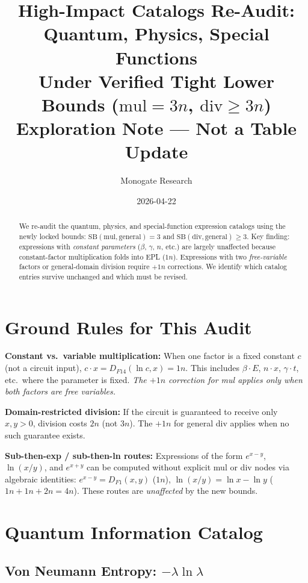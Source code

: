 \documentclass[11pt]{article}
\title{High-Impact Catalogs Re-Audit: Quantum, Physics, Special Functions\\
\large Under Verified Tight Lower Bounds ($\mathrm{mul}=3n$, $\mathrm{div}\geq 3n$)\\
Exploration Note --- Not a Table Update}
\author{Monogate Research}
\date{2026-04-22}
\begin{document}
\maketitle

\begin{abstract}
We re-audit the quantum, physics, and special-function expression catalogs
using the newly locked bounds: $\mathrm{SB}(\mathrm{mul},\mathrm{general}) = 3$
and $\mathrm{SB}(\mathrm{div},\mathrm{general}) \geq 3$.
Key finding: expressions with \emph{constant parameters} ($\beta$, $\gamma$, $n$, etc.)
are largely unaffected because constant-factor multiplication folds into EPL ($1n$).
Expressions with two \emph{free-variable} factors or general-domain division
require $+1n$ corrections. We identify which catalog entries survive unchanged
and which must be revised.
\end{abstract}

\section{Ground Rules for This Audit}

\textbf{Constant vs.\ variable multiplication:}
When one factor is a fixed constant $c$ (not a circuit input), $c \cdot x = D_{F14}(\ln c, x) = 1n$.
This includes $\beta \cdot E$, $n \cdot x$, $\gamma \cdot t$, etc.\ where the parameter is fixed.
\emph{The $+1n$ correction for mul applies only when both factors are free variables.}

\textbf{Domain-restricted division:}
If the circuit is guaranteed to receive only $x,y > 0$, division costs $2n$ (not $3n$).
The $+1n$ for general div applies when no such guarantee exists.

\textbf{Sub-then-exp / sub-then-ln routes:}
Expressions of the form $e^{x-y}$, $\ln(x/y)$, and $e^{x+y}$ can be computed without
explicit mul or div nodes via algebraic identities:
$e^{x-y} = D_{F1}(x,y)$ ($1n$), $\ln(x/y) = \ln x - \ln y$ ($1n + 1n + 2n = 4n$).
These routes are \emph{unaffected} by the new bounds.

\section{Quantum Information Catalog}

\subsection{Von Neumann Entropy: $-\lambda \ln \lambda$}
\end{document}
